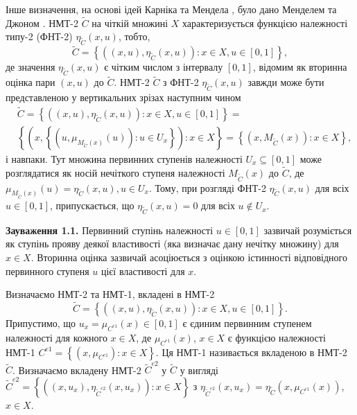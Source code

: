 \documentclass[14pt, a4paper, oneside]{extarticle}
\numberwithin{equation}{section}
\begin{document}
Інше визначення, на основі ідей Карніка та Мендела \cite{Karnik}, було дано Менделем та Джоном \cite{Mendel}. НМТ-2 $\tilde{C}$ на чіткій множині $X$ характеризується функцією належності типу-2 (ФНТ-2) $\eta_{\tilde{C}}(x, u)$, тобто,
\begin{equation*}
\tilde{C}=\left\{\left((x, u), \eta_{\tilde{C}}(x, u)\right): x \in X, u \in[0,1]\right\},
\end{equation*}
де значення $\eta_{\tilde{C}}(x, u)$ є чітким числом з інтервалу $[0,1]$, відомим як вторинна оцінка пари $(x, u)$ до $\tilde{C}$. НМТ-2 $\tilde{C}$ з ФНТ-2 $\eta_{\tilde{C}}(x, u)$ завжди може бути представленою у вертикальних зрізах наступним чином
\begin{equation*}
\begin{aligned}
& \tilde{C}=\left\{\left((x, u), \eta_{\tilde{C}}(x, u)\right): x \in X, u \in[0,1]\right\}= \\
& \left\{\left(x,\left\{\left(u, \mu_{M_{\tilde{C}}(x)}(u)\right): u \in U_{x}\right\}\right): x \in X\right\}=\left\{\left(x, M_{\tilde{C}}(x)\right): x \in X\right\},
\end{aligned}
\end{equation*}
і навпаки. Тут множина первинних ступенів належності $U_{x} \subseteq[0,1]$ може розглядатися як носій нечіткого ступеня належності $M_{\tilde{C}}(x)$ до $\tilde{C}$, де $\mu_{M_{\tilde{C}}(x)}(u)=\eta_{\tilde{C}}(x, u), u \in U_{x}$. Тому, при розгляді ФНТ-2 $\eta_{\tilde{C}}(x, u)$ для всіх $u \in[0,1]$, припускається, що $\eta_{\tilde{C}}(x, u)=0$ для всіх $u \notin U_{x}$.

\textbf{Зауваження 1.1.} Первинний ступінь належності $u \in[0,1]$ зазвичай розуміється як ступінь прояву деякої властивості (яка визначає дану нечітку множину) для $x \in X$. Вторинна оцінка зазвичай асоціюється з оцінкою істинності відповідного первинного ступеня $u$ цієї властивості для $x$.

Визначаємо НМТ-2 та НМТ-1, вкладені в НМТ-2
\begin{equation*}
\tilde{C}=\left\{\left((x, u), \eta_{\tilde{C}}(x, u)\right): x \in X, u \in[0,1]\right\}.
\end{equation*}
Припустимо, що $u_{x}=\mu_{C^{e 1}}(x) \in[0,1]$ є єдиним первинним ступенем належності для кожного $x \in X$, де $\mu_{C^{e 1}}(x)$, $x \in X$ є функцією належності НМТ-1 $C^{e 1}=\left\{\left(x, \mu_{C^{e 1}}\right): x \in X\right\}$. Ця НМТ-1 називається вкладеною в НМТ-2 $\tilde{C}$. Визначаємо вкладену НМТ-2 $\tilde{C}^{e 2}$ у $\tilde{C}$ у вигляді \\$\tilde{C}^{e 2}=\left\{\left(\left(x, u_{x}\right), \eta_{\tilde{C}^{e 2}}\left(x, u_{x}\right)\right): x \in X\right\}$ з $\eta_{\tilde{C}^{e 2}}\left(x, u_{x}\right)=\eta_{\tilde{C}}\left(x, \mu_{C^{e 1}}(x)\right)$, $x \in X$.
\end{document}
